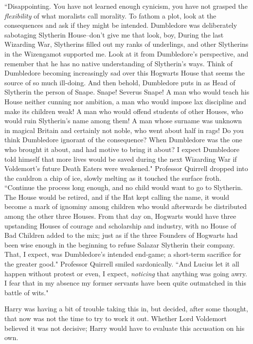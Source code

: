 ``Disappointing. You have not learned enough cynicism, you have not grasped the \emph{flexibility} of what moralists call morality. To fathom a plot, look at the consequences and ask if they might be intended. Dumbledore was deliberately sabotaging Slytherin House\---don't give me that look, boy,  During the last Wizarding War, Slytherins filled out my ranks of underlings, and other Slytherins in the Wizengamot supported me. Look at it from Dumbledore's perspective, and remember that he has no native understanding of Slytherin's ways. Think of Dumbledore becoming increasingly sad over this Hogwarts House that seems the source of so much ill-doing. And then behold, Dumbledore puts in as Head of Slytherin the person of Snape. Snape! Severus Snape! A man who would teach his House neither cunning nor ambition, a man who would impose lax discipline and make its children weak! A man who would offend students of other Houses, who would ruin Slytherin's name among them! A man whose surname was unknown in magical Britain and certainly not noble, who went about half in rags! Do you think Dumbledore ignorant of the consequence? When Dumbledore was the one who brought it about, and had motive to bring it about? I expect Dumbledore told himself that more lives would be saved during the next Wizarding War if Voldemort's future Death Eaters were weakened." Professor Quirrell dropped into the cauldron a chip of ice, slowly melting as it touched the surface froth. ``Continue the process long enough, and no child would want to go to Slytherin. The House would be retired, and if the Hat kept calling the name, it would become a mark of ignominy among children who would afterwards be distributed among the other three Houses. From that day on, Hogwarts would have three upstanding Houses of courage and scholarship and industry, with no House of Bad Children added to the mix; just as if the three Founders of Hogwarts had been wise enough in the beginning to refuse Salazar Slytherin their company. That, I expect, was Dumbledore's intended end-game; a short-term sacrifice for the greater good." Professor Quirrell smiled sardonically. ``And Lucius let it all happen without protest or even, I expect, \emph{noticing} that anything was going awry. I fear that in my absence my former servants have been quite outmatched in this battle of wits."

Harry was having a bit of trouble taking this in, but decided, after some thought, that now was not the time to try to work it out. Whether Lord Voldemort believed it was not decisive; Harry would have to evaluate this accusation on his own.

